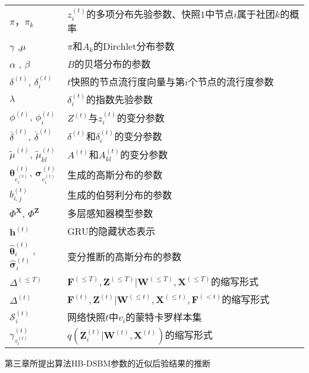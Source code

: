 \begin{center}
\begin{longtable}{@{}lp{300pt}@{}}
			$\pi$，$\pi_k$ & $z^{(t)}_i$的多项分布先验参数、快照$1$中节点$i$属于社团$k$的概率\\
			${\gamma}$ ,${\mu}$ & ${\pi}$和${A}_k$的Dirchlet分布参数 \\
			${\alpha}$ , ${\beta}$ & $B$的贝塔分布的参数 \\   
			$\delta^{(t)}$, $\delta_i^{(t)}$ & $t$快照的节点流行度向量与第$i$个节点的流行度参数 \\
			$\lambda$ & $\delta_i^{(t)}$的指数先验参数 \\
			$\phi^{(t)}$, $\phi^{(t)}_i$ &$Z^{(t)}$与$z^{(t)}_i$的变分参数 \\
			$\bar{\delta}^{(t)}$, $\bar{\delta}^{(t)}$ &$\delta^{(t)}$和$\delta^{(t)}_i$的变分参数 \\
			$\tilde{\mu}^{(t)}$, $\tilde{\mu}^{(t)}_{kl}$ &$A^{(t)}$和$A^{(t)}_{kl}$的变分参数 \\
			$\bm{\theta}_{c_i^{(t)}}^{(t)}$, $\bm{\sigma}_{c_i^{(t)}}^{(t)}$ & 生成的高斯分布的参数\\
			$b_{i,j}^{(t)}$ &  生成的伯努利分布的参数 \\
			$\Phi^{\mathbf{X}}$, $\Phi^{\mathbf{Z}}$& 多层感知器模型参数\\
			$\mathbf{h}^{(t)}$ & GRU的隐藏状态表示 \\
			$\hat{\bm{\theta}}^{(t)}_i$ , $\hat{\bm{\sigma}}^{(t)}_i$ & 变分推断的高斯分布的参数 \\
			$\Delta^{(\leq T)}$ & $\mathbf{F}^{(\leq T)}, \mathbf{Z}^{(\leq T)}|\mathbf{W}^{(\leq T)},\mathbf{X}^{(\leq T)}$的缩写形式 \\
			$\Delta^{(t)}$ & $\mathbf{F}^{(t)}, \mathbf{Z}^{(t)}|\mathbf{W}^{(\leq t)},\mathbf{X}^{(\leq t)},\mathbf{F}^{(< t)}$的缩写形式\\
			$\mathcal{S}_i^{(t)}$ & 网络快照$t$中$v_i$的蒙特卡罗样本集 \\
			$\gamma_{z_i^{(t)}}^{(t)}$ & $q(\mathbf{Z}_i^{(t)}|\mathbf{W}^{(t)},\mathbf{X}^{(t)})$的缩写形式 \\
			\hline
	\end{longtable}
\end{center}


\begin{proposition}
	第三章所提出算法HB-DSBM参数的近似后验结果的推断
\end{proposition}


